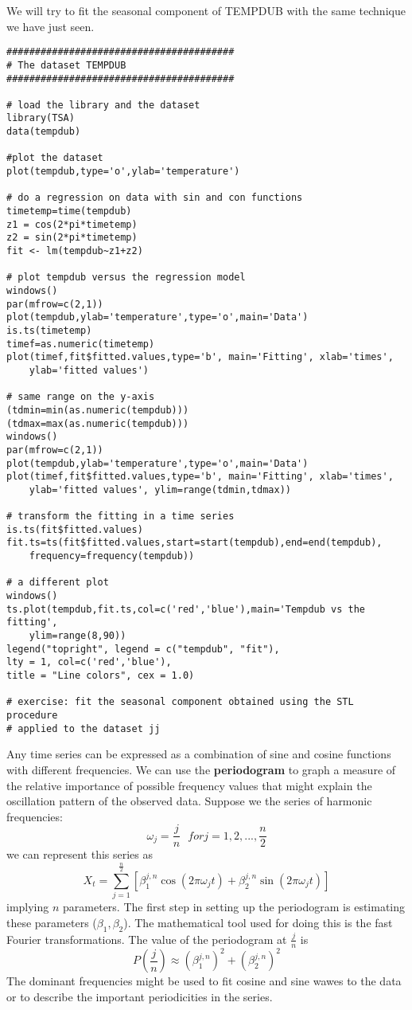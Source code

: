 \begin{example}
    We will try to fit the seasonal component of TEMPDUB with the same technique we have just seen.
    \begin{verbatim}
########################################
# The dataset TEMPDUB
########################################

# load the library and the dataset
library(TSA)
data(tempdub)

#plot the dataset
plot(tempdub,type='o',ylab='temperature')

# do a regression on data with sin and con functions
timetemp=time(tempdub)
z1 = cos(2*pi*timetemp)
z2 = sin(2*pi*timetemp)
fit <- lm(tempdub~z1+z2)

# plot tempdub versus the regression model
windows()
par(mfrow=c(2,1))
plot(tempdub,ylab='temperature',type='o',main='Data')
is.ts(timetemp)
timef=as.numeric(timetemp)
plot(timef,fit$fitted.values,type='b', main='Fitting', xlab='times',
    ylab='fitted values')

# same range on the y-axis
(tdmin=min(as.numeric(tempdub)))
(tdmax=max(as.numeric(tempdub)))
windows()
par(mfrow=c(2,1))
plot(tempdub,ylab='temperature',type='o',main='Data')
plot(timef,fit$fitted.values,type='b', main='Fitting', xlab='times',
    ylab='fitted values', ylim=range(tdmin,tdmax))

# transform the fitting in a time series
is.ts(fit$fitted.values)
fit.ts=ts(fit$fitted.values,start=start(tempdub),end=end(tempdub),
    frequency=frequency(tempdub))

# a different plot
windows()
ts.plot(tempdub,fit.ts,col=c('red','blue'),main='Tempdub vs the fitting',
    ylim=range(8,90))
legend("topright", legend = c("tempdub", "fit"),
lty = 1, col=c('red','blue'),
title = "Line colors", cex = 1.0)

# exercise: fit the seasonal component obtained using the STL procedure 
# applied to the dataset jj
    \end{verbatim}
\end{example}

Any time series can be expressed as a combination of sine and cosine functions with different frequencies. We can use the \textbf{periodogram} to graph a measure of the relative importance of possible frequency values that might explain the oscillation pattern of the observed data. Suppose we the series of harmonic frequencies:
\[
    \omega_j=\frac{j}{n}\ \ \ for j=1,2,...,\frac{n}{2}  
\]
we can represent this series as
\[
    X_t=\sum_{j=1}^{\frac{n}{2}}\left[\beta_1^{j,n}\cos(2\pi\omega_jt)+\beta_2^{j,n}\sin(2\pi\omega_jt)\right]  
\]
implying $n$ parameters. The first step in setting up the periodogram is estimating these parameters ($\beta_1,\beta_2$). The mathematical tool used for doing this is the fast Fourier transformations. The value of the periodogram at $\frac{j}{n}$ is
\[
    P\left(\frac{j}{n}\right)\approx(\beta_1^{j,n})^2+(\beta_2^{j,n})^2  
\]
The dominant frequencies might be used to fit cosine and sine wawes to the data or to describe the important periodicities in the series.

